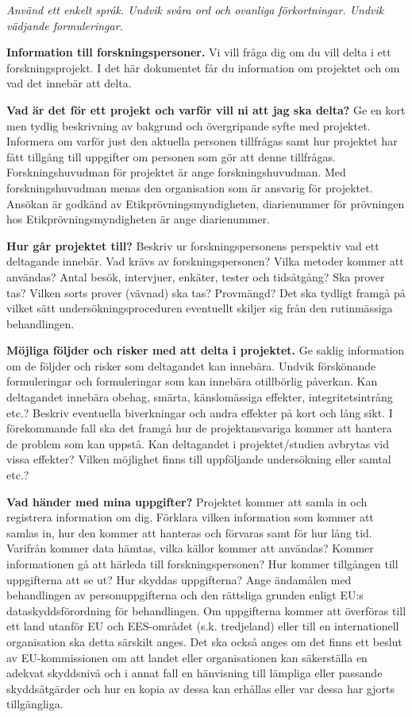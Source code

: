 \documentclass[
]{book}
\begin{document}
\emph{Använd ett enkelt språk. Undvik svåra ord och ovanliga förkortningar. Undvik vädjande formuleringar.}

\textbf{Information till forskningspersoner.} Vi vill fråga dig om du vill delta i ett forskningsprojekt. I det här dokumentet får du information om projektet och om vad det innebär att delta.

\textbf{Vad är det för ett projekt och varför vill ni att jag ska delta?} Ge en kort men tydlig beskrivning av bakgrund och övergripande syfte med projektet. Informera om varför just den aktuella personen tillfrågas samt hur projektet har fått tillgång till uppgifter om personen som gör att denne tillfrågas. Forskningshuvudman för projektet är ange forskningshuvudman. Med forskningshuvudman menas den organisation som är ansvarig för projektet. Ansökan är godkänd av Etikprövningsmyndigheten, diarienummer för prövningen hos Etikprövningsmyndigheten är ange diarienummer.

\textbf{Hur går projektet till?} Beskriv ur forskningspersonens perspektiv vad ett deltagande innebär. Vad krävs av forskningspersonen? Vilka metoder kommer att användas? Antal besök, intervjuer, enkäter, tester och tidsåtgång? Ska prover tas? Vilken sorts prover (vävnad) ska tas? Provmängd? Det ska tydligt framgå på vilket sätt undersökningsproceduren eventuellt skiljer sig från den rutinmässiga behandlingen.

\textbf{Möjliga följder och risker med att delta i projektet.} Ge saklig information om de följder och risker som deltagandet kan innebära. Undvik förskönande formuleringar och formuleringar som kan innebära otillbörlig påverkan. Kan deltagandet innebära obehag, smärta, känslomässiga effekter, integritetsintrång etc.? Beskriv eventuella biverkningar och andra effekter på kort och lång sikt. I förekommande fall ska det framgå hur de projektansvariga kommer att hantera de problem som kan uppstå. Kan deltagandet i projektet/studien avbrytas vid vissa effekter? Vilken möjlighet finns till uppföljande undersökning eller samtal etc.?

\textbf{Vad händer med mina uppgifter?} Projektet kommer att samla in och registrera information om dig. Förklara vilken information som kommer att samlas in, hur den kommer att hanteras och förvaras samt för hur lång tid. Varifrån kommer data hämtas, vilka källor kommer att användas? Kommer informationen gå att härleda till forskningspersonen? Hur kommer tillgången till uppgifterna att se ut? Hur skyddas uppgifterna? Ange ändamålen med behandlingen av personuppgifterna och den rättsliga grunden enligt EU:s dataskyddsförordning för behandlingen. Om uppgifterna kommer att överföras till ett land utanför EU och EES-området (s.k. tredjeland) eller till en internationell organisation ska detta särskilt anges. Det ska också anges om det finns ett beslut av EU-kommissionen om att landet eller organisationen kan säkerställa en adekvat skyddsnivå och i annat fall en hänvisning till lämpliga eller passande skyddsåtgärder och hur en kopia av dessa kan erhållas eller var dessa har gjorts tillgängliga.
\end{document}
